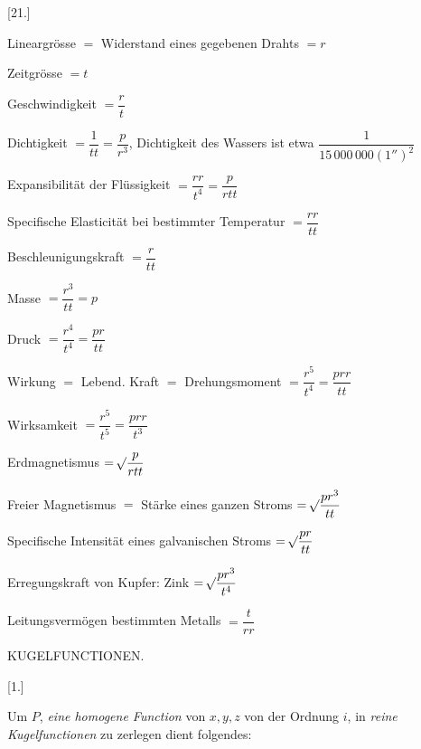 \begin{center}[21.]\end{center}
\noindent Lineargrösse $=$ Widerstand eines gegebenen Drahts $=r$\par
\noindent Zeitgrösse $=t$\par
\noindent Geschwindigkeit $=\dfrac rt$\par
\noindent Dichtigkeit $=\dfrac1{tt}=\dfrac p{r^3}$, Dichtigkeit des Wassers ist etwa $\dfrac1{15\,000\,000(1'')^2}$\par
\noindent Expansibilität der Flüssigkeit $=\dfrac{rr}{t^4}=\dfrac p{rtt}$\par
\noindent Specifische Elasticität bei bestimmter Temperatur $=\dfrac{rr}{tt}$\par
\noindent Beschleunigungskraft $=\dfrac r{tt}$\par
\noindent Masse $=\dfrac{r^3}{tt}=p$\par
\noindent Druck $=\dfrac{r^4}{t^4}=\dfrac{pr}{tt}$\par
\noindent Wirkung $=$ Lebend. Kraft $=$ Drehungsmoment $=\dfrac{r^5}{t^4}=\dfrac{prr}{tt}$\par
\noindent Wirksamkeit $=\dfrac{r^5}{t^5}=\dfrac{prr}{t^3}$\par
\noindent Erdmagnetismus $=\mathord{{}^{}\!\surd}\dfrac p{rtt}$\par
\noindent Freier Magnetismus $=$ Stärke eines ganzen Stroms $=\mathord{{}^{}\!\surd}\dfrac{pr^3}{tt}$\par
\noindent Specifische Intensität eines galvanischen Stroms $=\mathord{{}^{}\!\surd}\dfrac{pr}{tt}$\par
\noindent Erregungskraft von Kupfer: Zink $=\mathord{{}^{}\!\surd}\dfrac{pr^3}{t^4}$\par
\noindent Leitungsvermögen bestimmten Metalls $=\dfrac t{rr}$\par

\begin{center}KUGELFUNCTIONEN.\end{center}
\begin{center}[1.]\end{center}
Um $P$, \textit{eine homogene Function} von $x,y,z$ von der Ordnung $i$, in \textit{reine Kugelfunctionen} zu zerlegen dient folgendes:

